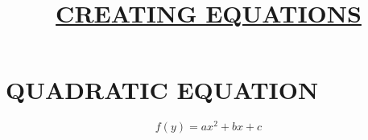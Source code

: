 \documentclass{article}
\title{\underline{CREATING EQUATIONS}}
\begin{document}
			\maketitle
			\section*{QUADRATIC EQUATION}
			\begin{equation*}
				f(y) = ax^2 + bx + c
			\end{equation*}
		
\end{document}
